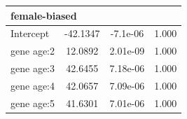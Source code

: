 \documentclass{article}
\begin{document}
\begin{table}[H]
\begin{tabular}{l |c | c| c}
        \hline
        \hline
        \multicolumn{4}{l}{female-biased}\\
        \hline
        Intercept & -42.1347 & -7.1e-06 & 1.000 \\
        \hline
        gene age:2 &  12.0892 & 2.01e-09 & 1.000 \\
        \hline
        gene age:3 &  42.6455 & 7.18e-06 & 1.000 \\
        \hline
        gene age:4 &  42.0657 & 7.09e-06 & 1.000 \\
        \hline
        gene age:5 &  41.6301 & 7.01e-06 & 1.000 \\
        \hline
    \end{tabular}
\end{table}

\fi
\end{document}
